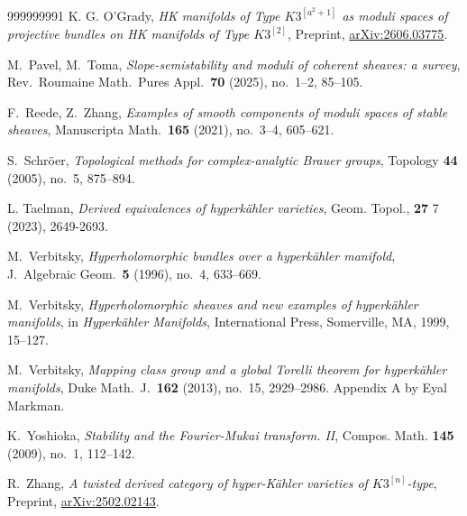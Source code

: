 \documentclass[12pt,a4paper]{amsart}
\theoremstyle{plain}
\theoremstyle{definition}
\theoremstyle{remark}
\begin{document}
\begin{thebibliography}{999999991}
K. G. O'Grady,
\textit{HK manifolds of Type $K3^{[a^2+1]}$ as moduli spaces of projective bundles on HK manifolds of Type $K3^{[2]}$},
Preprint,
\href{https://arxiv.org/abs/2606.03775}{arXiv:2606.03775}.
 

M.~Pavel, M.~Toma,
\textit{Slope-semistability and moduli of coherent sheaves: a survey},
Rev.\ Roumaine Math.\ Pures Appl.\ \textbf{70} (2025), no.~1--2, 85--105.

F.~Reede, Z.~Zhang,
\textit{Examples of smooth components of moduli spaces of stable sheaves},
Manuscripta Math.\ \textbf{165} (2021), no.~3--4, 605--621.

S.~Schr\"oer,
\textit{Topological methods for complex-analytic Brauer groups},
Topology \textbf{44} (2005), no.~5, 875--894.

L. Taelman, \textit{Derived equivalences of hyperkähler varieties}, 
Geom. Topol., \textbf{27} 7 (2023), 2649-2693.

M.~Verbitsky,
\textit{Hyperholomorphic bundles over a hyperk\"ahler manifold},
J.\ Algebraic Geom.\ \textbf{5} (1996), no.~4, 633--669.

M.~Verbitsky,
\textit{Hyperholomorphic sheaves and new examples of hyperk\"ahler manifolds},
in \textit{Hyperk\"ahler Manifolds}, International Press, Somerville, MA, 1999, 15--127.

M.~Verbitsky,
\textit{Mapping class group and a global Torelli theorem for hyperk\"ahler manifolds},
Duke Math.\ J.\ \textbf{162} (2013), no.~15, 2929--2986.
Appendix A by Eyal Markman.

K.~Yoshioka, \textit{Stability and the Fourier-Mukai transform. II}, Compos. Math. {\bf 145} (2009), no.~1, 112--142.

R.~Zhang,
\textit{A twisted derived category of hyper-K\"ahler varieties of $K3^{[n]}$-type},
Preprint, \href{https://arxiv.org/pdf/2502.02143}{arXiv:2502.02143}.


\end{thebibliography}
\end{document}
